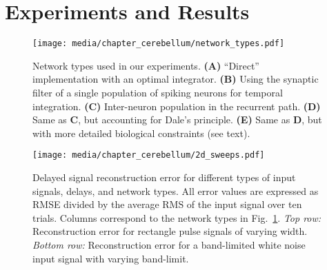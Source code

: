 
\section{Experiments and Results}


\begin{figure}[t]
	\centering
	\texttt{[image: media/chapter\_cerebellum/network\_types.pdf]}
	\caption[Network types used in the cerebellum experiments.]{Network types used in our experiments. \textbf{(A)} \enquote{Direct} implementation with an optimal integrator. \textbf{(B)} Using the synaptic filter of a single population of spiking neurons for temporal integration. \textbf{(C)} Inter-neuron population in the recurrent path. \textbf{(D)} Same as \textbf{C}, but accounting for Dale's principle. \textbf{(E)} Same as \textbf{D}, but with more detailed biological constraints (see text).}
	\label{fig:network_types}
\end{figure}

\begin{figure}[t]
	\centering
	\texttt{[image: media/chapter\_cerebellum/2d\_sweeps.pdf]}
	\caption[Delayed signal reconstruction errors in the Cerebellum model.]{Delayed signal reconstruction error for different types of input signals, delays, and network types. All error values are expressed as RMSE divided by the average RMS of the input signal over ten trials. Columns correspond to the network types in Fig.~\ref{fig:network_types}. \emph{Top row:} Reconstruction error for rectangle pulse signals of varying width. \emph{Bottom row:} Reconstruction error for a band-limited white noise input signal with varying band-limit.}
	\label{fig:basic_results}
\end{figure}

